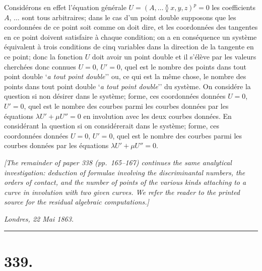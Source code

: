\documentclass[11pt,a4paper]{article}
\begin{document}
\medskip

\noindent Consid\'{e}rons en effet l'\'{e}quation g\'{e}n\'{e}rale $U=(A,\ldots\!\between\! x, y, z)^p=0$ les coefficients $A$, $\ldots$ sont tous arbitraires; dans le cas d'un point double supposons que les coordonn\'{e}es de ce point soit comme on doit dire, et les coordonn\'{e}es des tangentes en ce point doivent satisfaire \`{a} chaque condition; on a en cons\'{e}quence un syst\`{e}me \'{e}quivalent \`{a} trois conditions de cinq variables dans la direction de la tangente en ce point; donc la fonction $U$ doit avoir un point double et il s'\'{e}l\`{e}ve par les valeurs cherch\'{e}es donc connues $U=0$, $U'=0$, quel est le nombre des points dans tout point double `\textit{a tout point double}'' ou, ce qui est la m\^{e}me chose, le nombre des points dans tout point double `\textit{a tout point double}'' du syst\`{e}me. On consid\'{e}re la question si non d\'{e}sirer dans le syst\`{e}me; forme, ces coordonn\'{e}es donn\'{e}es $U=0$, $U'=0$, quel est le nombre des courbes parmi les courbes donn\'{e}es par les \'{e}quations $\lambda U' + \mu U''=0$ en involution avec les deux courbes donn\'{e}es. En consid\'{e}rant la question si on consid\'{e}rerait dans le syst\`{e}me; forme, ces coordonn\'{e}es donn\'{e}es $U=0$, $U'=0$, quel est le nombre des courbes parmi les courbes donn\'{e}es par les \'{e}quations $\lambda U' + \mu U''=0$.

\medskip

\noindent\textit{[The remainder of paper 338 (pp.\ 165--167) continues the same analytical investigation: deduction of formulae involving the discriminantal numbers, the orders of contact, and the number of points of the various kinds attaching to a curve in involution with two given curves. We refer the reader to the printed source for the residual algebraic computations.]}

\bigskip

\noindent\textit{Londres, 22 Mai 1863.}

\bigskip

\noindent\rule{\textwidth}{0.4pt}
\vspace{1em}

\section*{339.}
\end{document}
